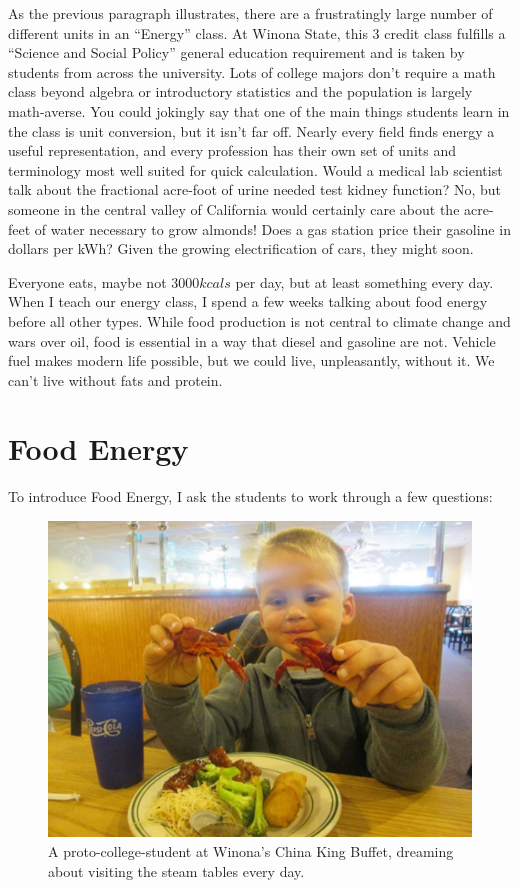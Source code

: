 \documentclass[jou]{apa7}
\begin{document}
As the previous paragraph illustrates, there are a frustratingly large number of different units in an ``Energy'' class.  At Winona 
State, this 3 credit class fulfills a ``Science and Social Policy'' general education requirement and is taken by students from across the university.   Lots of college majors don't require a math class beyond algebra or introductory statistics and the population is largely math-averse. You could jokingly say that one of the main things students learn in the class is unit conversion, but it isn't far off.  Nearly every field finds energy a useful representation, and every profession has their own set of units and terminology most well suited for quick calculation.  Would a medical lab scientist talk about the fractional acre-foot of urine needed test kidney function?  No, but someone in the central valley of California would certainly care about the acre-feet of water necessary to grow almonds!  Does a gas station price their gasoline in dollars per kWh? Given the growing electrification of cars, they might soon.

Everyone eats, maybe not $3000 kcals$ per day, but at least something every day.  When I teach our energy class,\cite{Energy_textbook,PFFP} 
I spend a few weeks talking about food energy before all other types.  While food production is not central to climate change and wars over oil, food is essential in a way that diesel and gasoline are not.  Vehicle fuel makes modern life possible, but we could live, unpleasantly, without it.  We can't live without fats and protein.  

\section{Food Energy}

To introduce Food Energy, I ask the students to work through a few questions:

\begin{figure}[h]
\centering
\includegraphics[width=\columnwidth]{at_the_buffet.jpg}
\caption{
A proto-college-student at Winona's 
China King Buffet, dreaming about visiting the steam tables every day. 
}
\label{buffet}
\end{figure}
\end{document}
